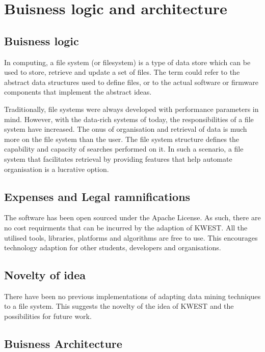 \section{Buisness logic and architecture}
\subsection{Buisness logic}
In computing, a file system (or filesystem) is a type of data store which can be used to store, retrieve and update a set of files. The term could refer to the abstract data structures used to define files, or to the actual software or firmware components that implement the abstract ideas.

Traditionally, file systems were always developed with performance parameters in mind. However, with the data-rich systems of today, the responsibilities of a file system have increased. The onus of organisation and retrieval of data is much more on the file system than the user. The file system structure defines the capability and capacity of searches performed on it. In such a scenario, a file system that facilitates retrieval by providing features that help automate organisation is a lucrative option.

\subsection{Expenses and Legal ramnifications}
The software has been open sourced under the Apache License. As such, there are no cost requirments that can be incurred by the adaption of KWEST. All the utilised tools, libraries, platforms and algorithms are free to use. This encourages technology adaption for other students, developers and organisations.

\subsection{Novelty of idea}
There have been no previous implementations of adapting data mining techniques to a file system. This suggests the novelty of the idea of KWEST and the possibilities for future work. 

\subsection{Buisness Architecture}
